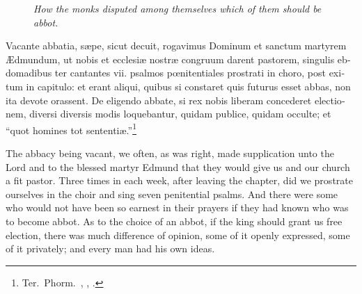 \documentclass{book}
\newcommand{\blockhead}[4][]{
\begin{figure}
\centering
\vspace{#4}
\parbox{2.75cm}{\begin{center}\footnotesize \color{BrickRed} \emph{#2}\\ #1 \end{center}}
\end{figure}
}
\begin{document}
\begin{paracol}{2}
\switchcolumn*

\begin{otherlanguage}{latin}
\blockhead{How the monks disputed among themselves which of them should be abbot.}{4}{-0.45cm}
Vacante abbatia, s\ae{}pe, sicut decuit, rogavimus Dominum et sanctum martyrem \AE{}dmundum, ut nobis et ecclesi\ae{} nostr\ae{} congruum darent pastorem, singulis ebdomadibus ter cantantes vii. psalmos p\oe{}nitentiales prostrati in choro, post exitum in capitulo: et erant aliqui, quibus si constaret quis futurus esset abbas, non ita devote orassent. De eligendo abbate, si rex nobis liberam concederet electionem, diversi diversis modis loquebantur, quidam publice, quidam occulte; et ``quot homines tot sententi\ae{}.''\footnote[\textdagger]{Ter.\ Phorm.\ , , .}

\end{otherlanguage}

\switchcolumn

The abbacy being vacant, we often, as was right, made supplication unto the Lord and to the blessed martyr Edmund that they would give us and our church a fit pastor. Three times in each week, after leaving the chapter, did we prostrate ourselves in the choir and sing seven penitential psalms. And there were some who would not have been so earnest in their prayers if they had known who was to become abbot. As to the choice of an abbot, if the king should grant us free election, there was much difference of opinion, some of it openly expressed, some of it privately; and every man had his own ideas.

\switchcolumn*


\end{paracol}
\end{document}
